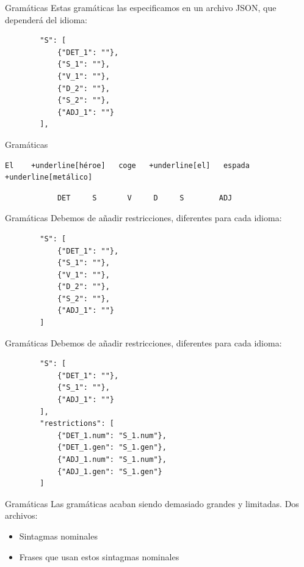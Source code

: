\begin{frame}[t, fragile]{Gramáticas}
Estas gramáticas las especificamos en un archivo JSON, que dependerá del idioma:
	\begin{verbatim}
		"S": [
	    	{"DET_1": ""},
	    	{"S_1": ""},
	    	{"V_1": ""},
	    	{"D_2": ""},
	    	{"S_2": ""},
	    	{"ADJ_1": ""}
		],
	\end{verbatim}
\end{frame}

\begin{frame}[t, fragile]{Gramáticas}
	\vspace*{\fill}
		\begin{Verbatim}[commandchars=+\[\]]
El    +underline[héroe]   coge   +underline[el]   espada   +underline[metálico]
		\end{Verbatim}
		\begin{verbatim}
			DET     S       V     D     S        ADJ
		\end{verbatim}
	\vspace*{\fill}
\end{frame}

\begin{frame}[t, fragile]{Gramáticas}
	Debemos de añadir restricciones, diferentes para cada idioma:
	\begin{verbatim}
		"S": [
	    	{"DET_1": ""},
	    	{"S_1": ""},
	    	{"V_1": ""},
	    	{"D_2": ""},
	    	{"S_2": ""},
	    	{"ADJ_1": ""}
		]
	\end{verbatim}
\end{frame}

\begin{frame}[t, fragile]{Gramáticas}
	Debemos de añadir restricciones, diferentes para cada idioma:
	\begin{verbatim}
		"S": [
	    	{"DET_1": ""},
	    	{"S_1": ""},
	    	{"ADJ_1": ""}
		],
        "restrictions": [
            {"DET_1.num": "S_1.num"},
            {"DET_1.gen": "S_1.gen"},
            {"ADJ_1.num": "S_1.num"},
            {"ADJ_1.gen": "S_1.gen"}
        ]
	\end{verbatim}
\end{frame}

\begin{frame}[t, fragile]{Gramáticas}
	Las gramáticas acaban siendo demasiado grandes y limitadas. Dos archivos:
	\begin{itemize}
		\item<+-| alert@+> Sintagmas nominales
		\item Frases que usan estos sintagmas nominales
	\end{itemize}
\end{frame}


